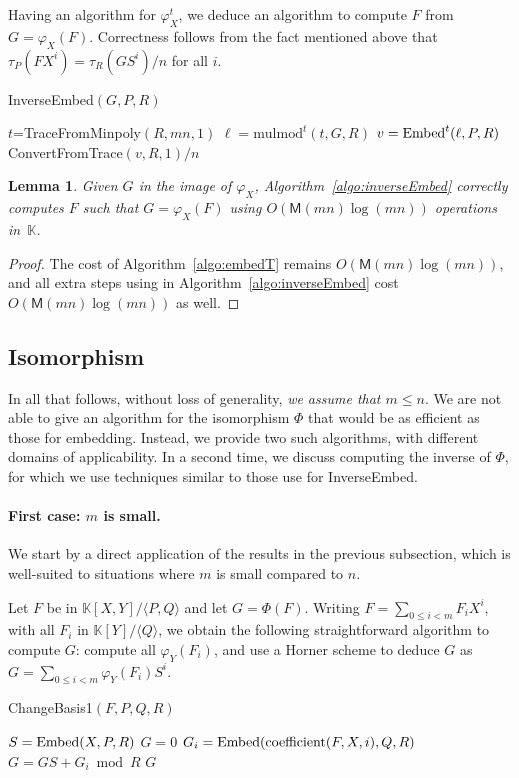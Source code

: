 \documentclass[12pt]{article}
\def\M {\ensuremath{\mathsf{M}}}
\def\K {\ensuremath{\mathbb{K}}}
\def\coeff {\ensuremath{\mathrm{coefficient}}}
\def\mulmod {\ensuremath{\mathrm{mulmod}}}
\newtheorem{Lemma}{Lemma}
\begin{document}
Having an algorithm for $\varphi_X^t$, we deduce an algorithm to
compute $F$ from $G=\varphi_X(F)$. Correctness follows from the fact
mentioned above that $\tau_P(F X^i) =\tau_R(G S^i)/n$ for all $i$.

\begin{algorithm}[H]
  \caption{InverseEmbed$(G,P,R)$}
  \begin{algorithmic}[1]
  \STATE $t$=TraceFromMinpoly$(R,mn,1)$
  \STATE $\ell = \mulmod^t(t,G,R)$
  \STATE $v={\rm Embed}^t(\ell,P,R)$
  \RETURN ConvertFromTrace$(v, R, 1)/n$
  \end{algorithmic}\label{algo:inverseEmbed}
\end{algorithm}

\begin{Lemma}
  Given $G$ in the image of $\varphi_X$, Algorithm~\ref{algo:inverseEmbed}
  correctly computes $F$ such that $G=\varphi_X(F)$ using
  $O(\M(mn)\log(mn))$ operations in~$\K$.
\end{Lemma}
\begin{proof}
  The cost of Algorithm~\ref{algo:embedT} remains $O(\M(mn)\log(mn))$,
  and all extra steps using in Algorithm~\ref{algo:inverseEmbed} 
  cost $O(\M(mn)\log(mn))$ as well.
\end{proof}



\subsection{Isomorphism} 

In all that follows, without loss of generality, {\em we assume that
  $m\le n$}. We are not able to give an algorithm for the isomorphism
$\Phi$ that would be as efficient as those for embedding. Instead, we
provide two such algorithms, with different domains of applicability.
In a second time, we discuss computing the inverse of $\Phi$,
for which we use techniques similar to those use for InverseEmbed.

\paragraph{First case: $m$ is small.}
We start by a direct application of the results in the previous
subsection, which is well-suited to situations where $m$ is small compared to $n$. 

Let $F$ be in $\K[X,Y]/\langle P,Q\rangle$ and let
$G=\Phi(F)$. Writing $F=\sum_{0 \le i < m} F_i X^i$, with all $F_i$ in
$\K[Y]/\langle Q \rangle$, we obtain the following straightforward
algorithm to compute $G$: compute all $\varphi_Y(F_i)$, and use a
Horner scheme to deduce $G$ as $G=\sum_{0 \le i < m} \varphi_Y(F_i) S^i$.
\begin{algorithm}[H]
  \caption{ChangeBasis1$(F,P,Q,R)$}
  \begin{algorithmic}[1]
    \STATE $S={\rm Embed}(X,P,R)$
    \STATE $G=0$
    \STATE $G_i = {\rm Embed}(\coeff(F,X,i),Q,R)$
    \STATE $G = GS+G_i \bmod R$
    \ENDFOR
    \RETURN $G$
  \end{algorithmic}
  \label{algo:iso1}
\end{algorithm}
\end{document}
